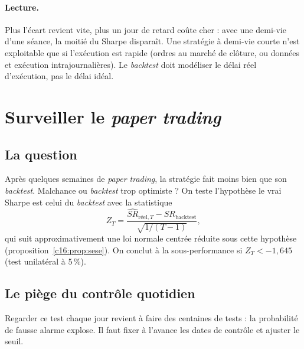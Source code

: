 \paragraph{Lecture.} Plus l'écart revient vite, plus un jour de retard coûte cher : avec une demi-vie d'une séance, la moitié du Sharpe disparaît. Une stratégie à demi-vie courte n'est exploitable que si l'exécution est rapide (ordres au marché de clôture, ou données et exécution intrajournalières). Le \emph{backtest} doit modéliser le délai réel d'exécution, pas le délai idéal.

\section{Surveiller le \emph{paper trading}}

\subsection{La question}

Après quelques semaines de \emph{paper trading}, la stratégie fait moins bien que son \emph{backtest}. Malchance ou \emph{backtest} trop optimiste ? On teste l'hypothèse \og le vrai Sharpe est celui du \emph{backtest}\fg{} avec la statistique
\[
Z_T = \frac{\widehat{SR}_{\text{réel},T} - SR_{\text{backtest}}}{\sqrt{1/(T-1)}},
\]
qui suit approximativement une loi normale centrée réduite sous cette hypothèse (proposition~\ref{c16:prop:sese}). On conclut à la sous-performance si $Z_T < -1{,}645$ (test unilatéral à 5\,\%).

\subsection{Le piège du contrôle quotidien}

Regarder ce test chaque jour revient à faire des centaines de tests : la probabilité de fausse alarme explose. Il faut fixer à l'avance les dates de contrôle et ajuster le seuil.

